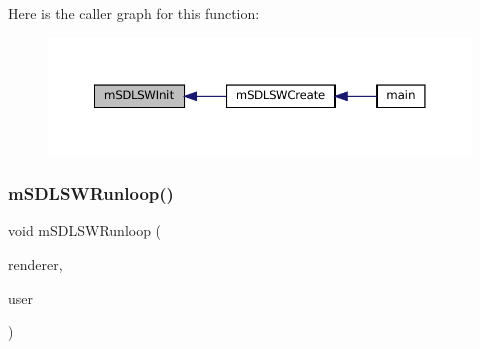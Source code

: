 Here is the caller graph for this function\+:
\nopagebreak
\begin{figure}[H]
\begin{center}
\leavevmode
\includegraphics[width=350pt]{sw-sdl_8c_aac002ada1b387a89102bceb5e2b2b9b9_icgraph}
\end{center}
\end{figure}
\mbox{\label{sw-sdl_8c_a96edfd01d5672d6808d8d91f3053d79d}} 
\subsubsection{\texorpdfstring{m\+S\+D\+L\+S\+W\+Runloop()}{mSDLSWRunloop()}}
{\footnotesize\ttfamily void m\+S\+D\+L\+S\+W\+Runloop (\begin{DoxyParamCaption}\item[{struct \mbox{\hyperlink{structm_s_d_l_renderer}{m\+S\+D\+L\+Renderer}} $\ast$}]{renderer,  }\item[{void $\ast$}]{user }\end{DoxyParamCaption})\hspace{0.3cm}{\ttfamily [static]}}

